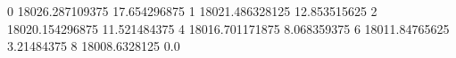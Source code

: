 0 18026.287109375 17.654296875
1 18021.486328125 12.853515625
2 18020.154296875 11.521484375
4 18016.701171875 8.068359375
6 18011.84765625 3.21484375
8 18008.6328125 0.0
